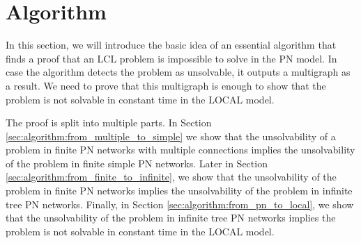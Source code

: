 
\section{Algorithm} \label{sec:algorithm}


%
%
%




In this section, we will introduce the basic idea of an essential algorithm that finds a proof that an LCL problem is impossible to solve in the PN model.
In case the algorithm detects the problem as unsolvable, it outputs a multigraph as a result.
We need to prove that this multigraph is enough to show that the problem is not solvable in constant time in the LOCAL model.

The proof is split into multiple parts.
In Section \ref{sec:algorithm:from_multiple_to_simple} we show that the unsolvability of a problem in finite PN networks with multiple connections implies the unsolvability of the problem in finite simple PN networks.
Later in Section \ref{sec:algorithm:from_finite_to_infinite}, we show that the unsolvability of the problem in finite PN networks implies the unsolvability of the problem in infinite tree PN networks.
Finally, in Section \ref{sec:algorithm:from_pn_to_local}, we show that the unsolvability of the problem in infinite tree PN networks implies the problem is not solvable in constant time in the LOCAL model.

